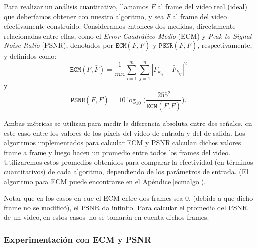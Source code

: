 \par Para realizar un an\'alisis cuantitativo, llamamos $F$ al frame del video real (ideal) que deber\'iamos obtener con nuestro algoritmo, y sea $\bar{F}$ al frame del video efectivamente construido. Consideramos entonces dos medidas, directamente relacionadas entre ellas, como el \emph{Error Cuadr\'atico Medio} (ECM) y \emph{Peak to Signal Noise Ratio} (PSNR), denotados por $\texttt{ECM}(F,\bar{F})$ y $\texttt{PSNR}(F,\bar{F})$, respectivamente, y definidos como:
\begin{equation*}
\texttt{ECM}(F,\bar{F}) = \frac{1}{mn}\sum_{i=1}^m\sum_{j = 1}^n |F_{k_{ij}} - \bar{F}_{k_{ij}}|^2 \label{eq:ecm}
\end{equation*}
\noindent y
\begin{equation*}
\texttt{PSNR}(F,\bar{F}) = 10 \log_{10}\bigg(\frac{255^2}{\texttt{ECM}(F,\bar{F})}\bigg). \label{eq:psnr}
\end{equation*}
\par Ambas métricas se utilizan para medir la diferencia absoluta entre dos señales, en este caso entre los valores de los pixels del video de entrada y del de salida. Los algoritmos implementados para calcular ECM y PSNR calculan dichos valores frame a frame y luego hacen un promedio entre todos los frames del video. Utilizaremos estos promedios obtenidos para comparar la efectividad (en términos cuantitativos) de cada algoritmo, dependiendo de los parámetros de entrada. (El algoritmo para ECM puede encontrarse en el Apéndice \ref{ecmalgo}). 
\par Notar que en los casos en que el ECM entre dos frames sea 0, (debido a que dicho frame no se modificó), el PSNR da infinito. Para calcular el promedio del PSNR de un video, en estos casos, no se tomarán en cuenta dichos frames.

\subsubsection{Experimentación con ECM y PSNR}

